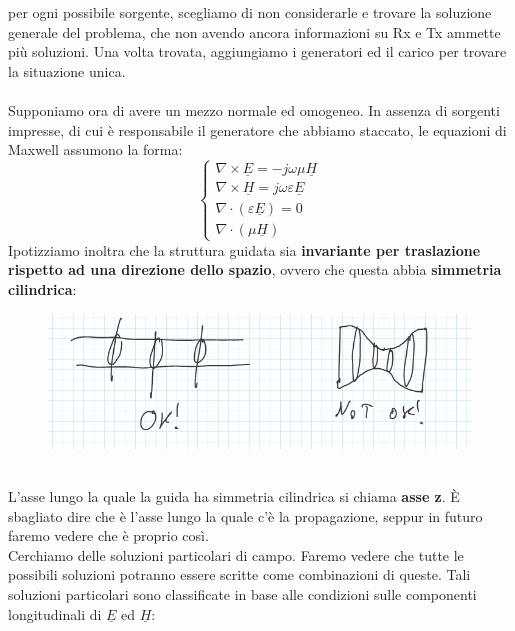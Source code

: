 \documentclass{book}
\begin{document}
        per ogni possibile sorgente, scegliamo di non considerarle e trovare la soluzione generale del problema, che non avendo ancora informazioni su Rx e Tx ammette più soluzioni.
        Una volta trovata, aggiungiamo i generatori ed il carico per trovare la situazione unica. \\ \\
        Supponiamo ora di avere un mezzo normale ed omogeneo. In assenza di sorgenti impresse, di cui è responsabile il generatore che abbiamo staccato, le equazioni di Maxwell
        assumono la forma:
        \begin{equation}
            \begin{cases}
                \nabla \times \underline{E} = -j \omega \mu \underline{H} \\
                \nabla \times \underline{H} =j \omega \varepsilon \underline{E} \\
                \nabla \cdot (\varepsilon \underline{E}) = 0 \\
                \nabla \cdot (\mu\underline{H})
            \end{cases}
        \end{equation}
        Ipotizziamo inoltra che la struttura guidata sia \textbf{invariante per traslazione rispetto ad una direzione dello spazio}, ovvero
        che questa abbia \textbf{simmetria cilindrica}:
        \begin{figure}[h!]
            \center  
            \includegraphics[width=0.75\linewidth]{Chapter_two/Chapt2img2.png}
        \end{figure} \\
        L'asse lungo la quale la guida ha simmetria cilindrica si chiama \textbf{asse z}. È sbagliato dire che
        è l'asse lungo la quale c'è la propagazione, seppur in futuro faremo vedere che è proprio così. \\
        Cerchiamo delle soluzioni particolari di campo. Faremo vedere che tutte le possibili soluzioni
        potranno essere scritte come combinazioni di queste. Tali soluzioni particolari sono classificate in base
        alle condizioni sulle componenti longitudinali di $\underline{E}$ ed $\underline{H}$:
\end{document}
